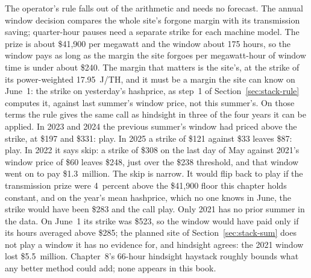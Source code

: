 The operator's rule falls out of the arithmetic and needs no forecast. The annual window decision compares the whole site's forgone margin with its transmission saving; quarter-hour pauses need a separate strike for each machine model. The prize is about \$41,900 per megawatt and the window about 175 hours, so the window pays as long as the margin the site forgoes per megawatt-hour of window time is under about \$240. The margin that matters is the site's, at the strike of its power-weighted 17.95~J/TH, and it must be a margin the site can know on June~1: the strike on yesterday's hashprice, as step~1 of Section~\ref{sec:stack-rule} computes it, against last summer's window price, not this summer's. On those terms the rule gives the same call as hindsight in three of the four years it can be applied. In 2023 and 2024 the previous summer's window had priced above the strike, at \$197 and \$331: play. In 2025 a strike of \$121 against \$33 leaves \$87: play. %
In 2022 it says skip: a strike of \$308 on the last day of May against 2021's window price of \$60 leaves \$248, just over the \$238 threshold, and that window went on to pay \$1.3~million. The skip is narrow. It would flip back to play if the transmission prize were 4~percent above the \$41,900 floor this chapter holds constant, and on the year's mean hashprice, which no one knows in June, the strike would have been \$283 and the call play. %
Only 2021 has no prior summer in the data. On June~1 its strike was \$523, so the window would have paid only if its hours averaged above \$285; the planned site of Section~\ref{sec:stack-sum} does not play a window it has no evidence for, and hindsight agrees: the 2021 window lost \$5.5~million. %
Chapter~8's 66-hour hindsight haystack roughly bounds what any better method could add; none appears in this book. %

